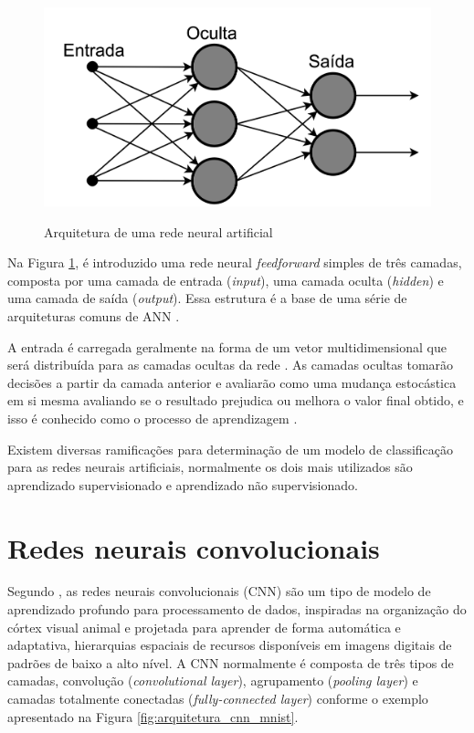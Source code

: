 \documentclass[
	12pt,				%
	oneside,			%
	a4paper,			%
	english,			%
	brazil				%
	]{abntex2ppgsi}
\begin{document}
\begin{figure}[H]
    \centering
    \caption{Arquitetura de uma rede neural artificial}
    \includegraphics[scale=.25]{imagens/conceitos_basicos/artificial_neural_networks_arch.jpg}
    \label{fig:artificial_neural_networks_arch}
\end{figure}

Na Figura \ref{fig:artificial_neural_networks_arch}, é introduzido uma rede neural \textit{feedforward} simples de três camadas, composta por uma camada de entrada (\textit{input}), uma camada oculta (\textit{hidden}) e uma camada de saída (\textit{output}). Essa estrutura é a base de uma série de arquiteturas comuns de ANN \cite{o2015introduction}.

A entrada é carregada geralmente na forma de um vetor multidimensional que será distribuída para as camadas ocultas da rede \cite{o2015introduction}. As camadas ocultas tomarão decisões a partir da camada anterior e avaliarão como uma mudança estocástica em si mesma avaliando se o resultado prejudica ou melhora o valor final obtido, e isso é conhecido como o processo de aprendizagem \cite{o2015introduction}. 

Existem diversas ramificações para determinação de um modelo de classificação para as redes neurais artificiais, normalmente os dois mais utilizados são aprendizado supervisionado e aprendizado não supervisionado.

\section{Redes neurais convolucionais}
Segundo , as redes neurais convolucionais (CNN) são um tipo de modelo de aprendizado profundo para processamento de dados, inspiradas na organização do córtex visual animal e projetada para aprender de forma automática e adaptativa, hierarquias espaciais de recursos disponíveis em imagens digitais de padrões de baixo a alto nível. A CNN normalmente é composta de três tipos de camadas, convolução (\textit{convolutional layer}), agrupamento (\textit{pooling layer}) e camadas totalmente conectadas (\textit{fully-connected layer}) conforme o exemplo apresentado na Figura \ref{fig:arquitetura_cnn_mnist}.
\end{document}
